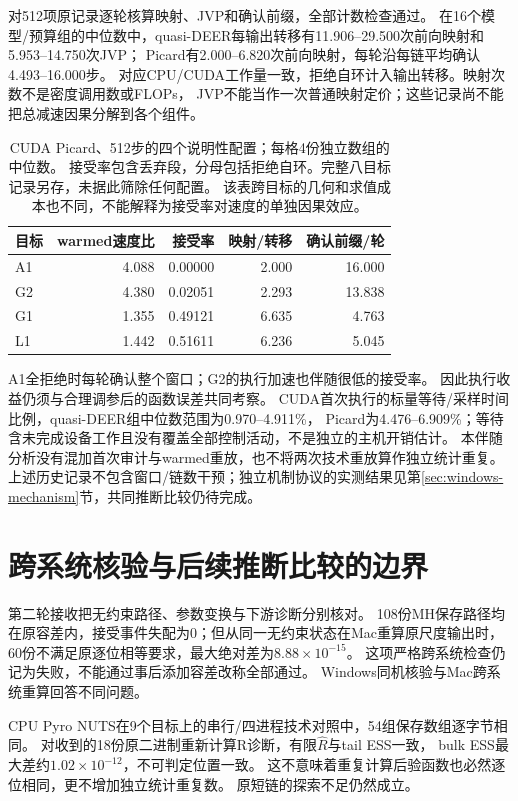 对512项原记录逐轮核算映射、JVP和确认前缀，全部计数检查通过。
在16个模型/预算组的中位数中，quasi-DEER每输出转移有11.906--29.500次前向映射和5.953--14.750次JVP；
Picard有2.000--6.820次前向映射，每轮沿每链平均确认4.493--16.000步。
对应CPU/CUDA工作量一致，拒绝自环计入输出转移。映射次数不是密度调用数或FLOPs，
JVP不能当作一次普通映射定价；这些记录尚不能把总减速因果分解到各个组件。

\begin{table}[htbp]\centering\small
\begin{tabular}{lrrrr}\toprule
目标 & warmed速度比 & 接受率 & 映射/转移 & 确认前缀/轮\\\midrule
A1 & 4.088 & 0.00000 & 2.000 & 16.000\\
G2 & 4.380 & 0.02051 & 2.293 & 13.838\\
G1 & 1.355 & 0.49121 & 6.635 & 4.763\\
L1 & 1.442 & 0.51611 & 6.236 & 5.045\\
\bottomrule\end{tabular}
\caption{CUDA Picard、512步的四个说明性配置；每格4份独立数组的中位数。
接受率包含丢弃段，分母包括拒绝自环。完整八目标记录另存，未据此筛除任何配置。
该表跨目标的几何和求值成本也不同，不能解释为接受率对速度的单独因果效应。}
\end{table}

A1全拒绝时每轮确认整个窗口；G2的执行加速也伴随很低的接受率。
因此执行收益仍须与合理调参后的函数误差共同考察。
CUDA首次执行的标量等待/采样时间比例，quasi-DEER组中位数范围为0.970--4.911\%，
Picard为4.476--6.909\%；等待含未完成设备工作且没有覆盖全部控制活动，不是独立的主机开销估计。
本伴随分析没有混加首次审计与warmed重放，也不将两次技术重放算作独立统计重复。
上述历史记录不包含窗口/链数干预；独立机制协议的实测结果见第\ref{sec:windows-mechanism}节，共同推断比较仍待完成。

\section{跨系统核验与后续推断比较的边界}
第二轮接收把无约束路径、参数变换与下游诊断分别核对。
108份MH保存路径均在原容差内，接受事件失配为0；但从同一无约束状态在Mac重算原尺度输出时，
60份不满足原逐位相等要求，最大绝对差为$8.88\times10^{-15}$。
这项严格跨系统检查仍记为失败，不能通过事后添加容差改称全部通过。
Windows同机核验与Mac跨系统重算回答不同问题。

CPU Pyro NUTS在9个目标上的串行/四进程技术对照中，54组保存数组逐字节相同。
对收到的18份原二进制重新计算R诊断，有限$\hat R$与tail ESS一致，
bulk ESS最大差约$1.02\times10^{-12}$，不可判定位置一致。
这不意味着重复计算后验函数也必然逐位相同，更不增加独立统计重复数。
原短链的探索不足仍然成立。

